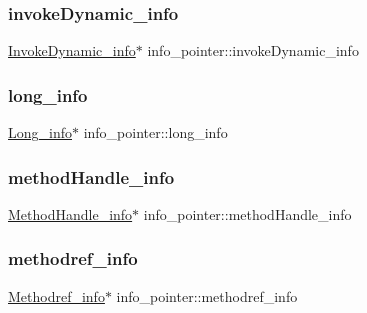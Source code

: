 \subsubsection{\texorpdfstring{invoke\+Dynamic\+\_\+info}{invokeDynamic\_info}}
{\footnotesize\ttfamily \hyperlink{struct_invoke_dynamic__info}{Invoke\+Dynamic\+\_\+info}$\ast$ info\+\_\+pointer\+::invoke\+Dynamic\+\_\+info}

\hypertarget{unioninfo__pointer_a085ec961e30e67b88e20daac50c53f2a}{}\label{unioninfo__pointer_a085ec961e30e67b88e20daac50c53f2a} 
\subsubsection{\texorpdfstring{long\+\_\+info}{long\_info}}
{\footnotesize\ttfamily \hyperlink{struct_long__info}{Long\+\_\+info}$\ast$ info\+\_\+pointer\+::long\+\_\+info}

\hypertarget{unioninfo__pointer_aded37473be29ff4ed1b1b6acbeb869f6}{}\label{unioninfo__pointer_aded37473be29ff4ed1b1b6acbeb869f6} 
\subsubsection{\texorpdfstring{method\+Handle\+\_\+info}{methodHandle\_info}}
{\footnotesize\ttfamily \hyperlink{struct_method_handle__info}{Method\+Handle\+\_\+info}$\ast$ info\+\_\+pointer\+::method\+Handle\+\_\+info}

\hypertarget{unioninfo__pointer_a760a3b954cf255258b61a818c5d4ed07}{}\label{unioninfo__pointer_a760a3b954cf255258b61a818c5d4ed07} 
\subsubsection{\texorpdfstring{methodref\+\_\+info}{methodref\_info}}
{\footnotesize\ttfamily \hyperlink{struct_methodref__info}{Methodref\+\_\+info}$\ast$ info\+\_\+pointer\+::methodref\+\_\+info}

\hypertarget{unioninfo__pointer_a87ced2262cbee8291ed014fe299c0aeb}{}\label{unioninfo__pointer_a87ced2262cbee8291ed014fe299c0aeb} 
